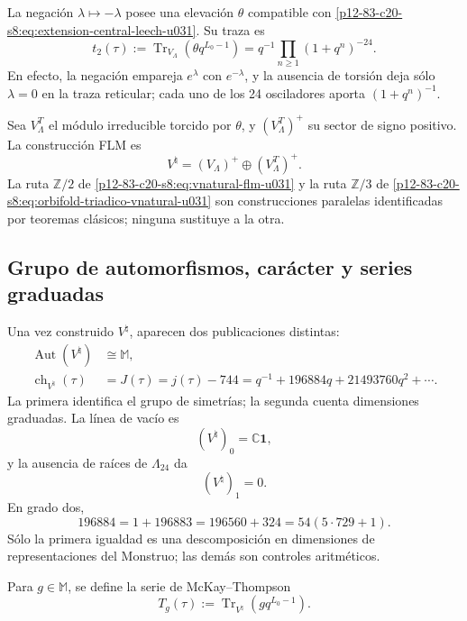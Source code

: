 La negación \(\lambda\mapsto-\lambda\) posee una elevación
\(\theta\) compatible con \eqref{p12-83-c20-s8:eq:extension-central-leech-u031}. Su traza
es
\begin{equation}
 t_2(\tau)
 :=
 \operatorname{Tr}_{V_\Lambda}
 (\theta q^{L_0-1})
 =q^{-1}\prod_{n\ge1}(1+q^n)^{-24}.
 \label{p12-83-c20-s8:eq:t2-leech-u031}
\end{equation}
En efecto, la negación empareja \(e^\lambda\) con \(e^{-\lambda}\), y la
ausencia de torsión deja sólo \(\lambda=0\) en la traza reticular; cada uno
de los 24 osciladores aporta \((1+q^n)^{-1}\).

Sea \(V_\Lambda^T\) el módulo irreducible torcido por \(\theta\), y
\((V_\Lambda^T)^+\) su sector de signo positivo. La construcción FLM es
\begin{equation}
 V^\natural
 =(V_\Lambda)^+\oplus(V_\Lambda^T)^+.
 \label{p12-83-c20-s8:eq:vnatural-flm-u031}
\end{equation}
La ruta \(\mathbb Z/2\) de
\eqref{p12-83-c20-s8:eq:vnatural-flm-u031} y la ruta \(\mathbb Z/3\) de
\eqref{p12-83-c20-s8:eq:orbifold-triadico-vnatural-u031} son construcciones paralelas
identificadas por teoremas clásicos; ninguna sustituye a la otra.

\subsection{Grupo de automorfismos, carácter y series graduadas}

Una vez construido \(V^\natural\), aparecen dos publicaciones distintas:
\begin{align}
 \operatorname{Aut}(V^\natural)&\cong\mathbb M,
 \label{p12-83-c20-s8:eq:aut-vnatural-monstruo-u031}\\
 \operatorname{ch}_{V^\natural}(\tau)
 &=J(\tau)=j(\tau)-744
 =q^{-1}+196884q+21493760q^2+\cdots.
 \label{p12-83-c20-s8:eq:caracter-vnatural-j-u031}
\end{align}
La primera identifica el grupo de simetrías; la segunda cuenta dimensiones
graduadas. La línea de vacío es
\[
 (V^\natural)_0=\mathbb C\mathbf1,
\]
y la ausencia de raíces de \(\Lambda_{24}\) da
\[
 (V^\natural)_1=0.
\]
En grado dos,
\[
 196884=1+196883=196560+324=54(5\cdot729+1).
\]
Sólo la primera igualdad es una descomposición en dimensiones de
representaciones del Monstruo; las demás son controles aritméticos.

Para \(g\in\mathbb M\), se define la serie de McKay--Thompson
\begin{equation}
 T_g(\tau):=
 \operatorname{Tr}_{V^\natural}
 \left(gq^{L_0-1}\right).
 \label{p12-83-c20-s8:eq:serie-mckay-thompson-u031}
\end{equation}

